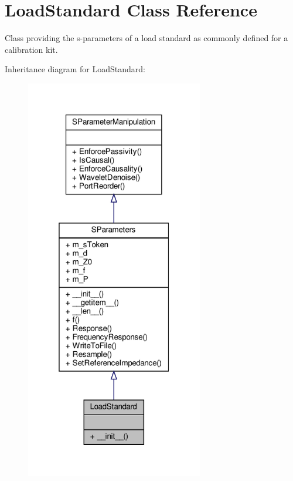 \hypertarget{classSignalIntegrity_1_1Measurement_1_1CalKit_1_1Standards_1_1LoadStandard_1_1LoadStandard}{}\section{Load\+Standard Class Reference}
\label{classSignalIntegrity_1_1Measurement_1_1CalKit_1_1Standards_1_1LoadStandard_1_1LoadStandard}


Class providing the s-\/parameters of a load standard as commonly defined for a calibration kit.  




Inheritance diagram for Load\+Standard\+:\nopagebreak
\begin{figure}[H]
\begin{center}
\leavevmode
\includegraphics[width=220pt]{classSignalIntegrity_1_1Measurement_1_1CalKit_1_1Standards_1_1LoadStandard_1_1LoadStandard__inherit__graph}
\end{center}
\end{figure}


